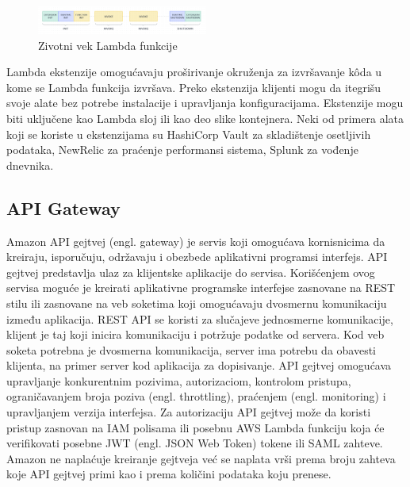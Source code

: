 \documentclass[12pt,oneside]{memoir}
\begin{document}

\begin{figure}[!ht]
  \centering
  \includegraphics[width=0.5\textwidth]{AWS-Lambda-zivotnivek.png}
  \caption{Zivotni vek Lambda funkcije}
  \label{fig:awsLambdaZivotniVek}
\end{figure}
 
Lambda ekstenzije omogućavaju proširivanje okruženja za izvršavanje kôda u kome se Lambda funkcija izvršava. Preko ekstenzija klijenti mogu da itegrišu svoje alate bez potrebe instalacije i upravljanja konfiguracijama. Ekstenzije mogu biti uključene kao Lambda sloj ili kao deo slike kontejnera. Neki od primera alata koji se koriste u ekstenzijama su HashiCorp Vault za skladištenje osetljivih podataka, NewRelic za praćenje performansi sistema, Splunk za vođenje dnevnika.

\subsection{API Gateway}
 
Amazon API gejtvej (engl. gateway) je servis koji omogućava kornisnicima da kreiraju, isporučuju, održavaju i obezbede aplikativni programsi interfejs. API gejtvej predstavlja ulaz za klijentske aplikacije do servisa. Korišćenjem ovog servisa moguće je kreirati aplikativne programske interfejse zasnovane na REST stilu ili zasnovane na veb soketima koji omogućavaju dvosmernu komunikaciju između aplikacija. REST API se koristi za slučajeve jednosmerne komunikacije, klijent je taj koji inicira komunikaciju i potržuje podatke od servera. Kod veb soketa potrebna je dvosmerna komunikacija, server ima potrebu da obavesti klijenta, na primer server kod aplikacija za dopisivanje. API gejtvej omogućava upravljanje konkurentnim pozivima, autorizaciom, kontrolom pristupa, ograničavanjem broja poziva (engl. throttling), praćenjem (engl. monitoring) i upravljanjem verzija interfejsa. Za autorizaciju API gejtvej može da koristi pristup zasnovan na IAM polisama ili posebnu AWS Lambda funkciju koja će verifikovati posebne JWT (engl. JSON Web Token) tokene ili SAML zahteve. Amazon ne naplaćuje kreiranje gejtveja već se naplata vrši prema broju zahteva koje API gejtvej primi kao i prema količini podataka koju prenese. 
 
\end{document}
